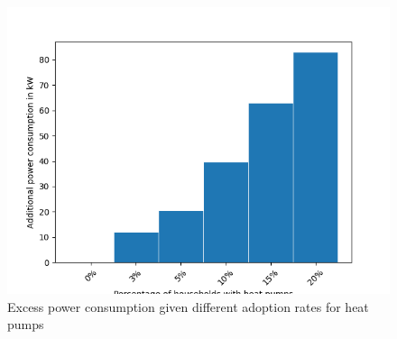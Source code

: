 \begin{figure}[!ht]
    \center
    \includegraphics[scale=.7]{figs/eval/scenario4/percentageeval.png}
    \caption{Excess power consumption given different adoption 
    rates for heat pumps}
    \label{warningmessagedifferentadoptionrates}
\end{figure}

